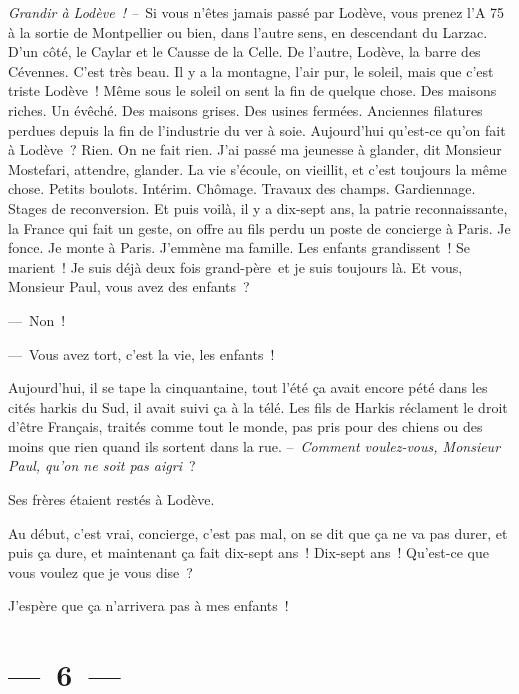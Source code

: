 \documentclass[twoside]{book} %
\begin{document}
\noindent \emph{Grandir à Lodève ! –} Si vous n’êtes jamais passé par Lodève, vous prenez l’A 75 à la sortie de Montpellier ou bien, dans l’autre sens, en descendant du Larzac. D’un côté, le Caylar et le Causse de la Celle. De l’autre, Lodève, la barre des Cévennes. C’est très beau. Il y a la montagne, l’air pur, le soleil, mais que c’est triste Lodève ! Même sous le soleil on sent la fin de quelque chose. Des maisons riches. Un évêché. Des maisons grises. Des usines fermées. Anciennes filatures perdues depuis la fin de l’industrie du ver à soie. Aujourd’hui qu’est-ce qu’on fait à Lodève ? Rien. On ne fait rien. J’ai passé ma jeunesse à glander, dit Monsieur Mostefari, attendre, glander. La vie s’écoule, on vieillit, et c’est toujours la même chose. Petits boulots. Intérim. Chômage. Travaux des champs. Gardiennage. Stages de reconversion. Et puis voilà, il y a dix-sept ans, la patrie reconnaissante, la France qui fait un geste, on offre au fils perdu un poste de concierge à Paris. Je fonce. Je monte à Paris. J’emmène ma famille. Les enfants grandissent ! Se marient ! Je suis déjà deux fois grand-père et je suis toujours là. Et vous, Monsieur Paul, vous avez des enfants ?\par
— Non !\par
— Vous avez tort, c’est la vie, les enfants !\par
Aujourd’hui, il se tape la cinquantaine, tout l’été ça avait encore pété dans les cités harkis du Sud, il avait suivi ça à la télé. Les fils de Harkis réclament le droit d’être Français, traités comme tout le monde, pas pris pour des chiens ou des moins que rien quand ils sortent dans la rue. – \emph{Comment voulez-vous, Monsieur Paul, qu’on ne soit pas aigri} ?\par
Ses frères étaient restés à Lodève.\par
Au début, c’est vrai, concierge, c’est pas mal, on se dit que ça ne va pas durer, et puis ça dure, et maintenant ça fait dix-sept ans ! Dix-sept ans ! Qu’est-ce que vous voulez que je vous dise ?\par
J’espère que ça n’arrivera pas à mes enfants !

\section[{— 6 —}]{— 6 —}
\renewcommand{\leftmark}{— 6 —}
\end{document}
